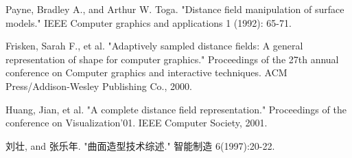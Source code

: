 \documentclass[11pt]{article}
\begin{document}
\begin{thebibliography}{1}
 Payne, Bradley A., and Arthur W. Toga. "Distance field manipulation of surface models." IEEE Computer graphics and applications 1 (1992): 65-71.

 Frisken, Sarah F., et al. "Adaptively sampled distance fields: A general representation of shape for computer graphics." Proceedings of the 27th annual conference on Computer graphics and interactive techniques. ACM Press/Addison-Wesley Publishing Co., 2000.

 Huang, Jian, et al. "A complete distance field representation." Proceedings of the conference on Visualization'01. IEEE Computer Society, 2001.

 刘壮, and 张乐年. "曲面造型技术综述." 智能制造 6(1997):20-22.
\end{thebibliography}
\end{document}

